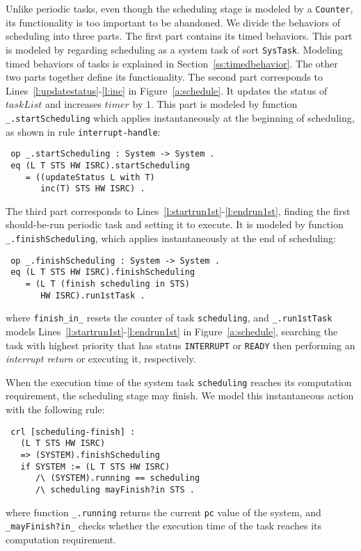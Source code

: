 \documentclass[10pt,journal]{IEEEtran}
\newcommand{\hide}[1]{\ignorespaces}
\begin{document}
Unlike periodic tasks, even though the scheduling stage is modeled by
a \verb|Counter|, its functionality is too important to be abandoned.
We divide the behaviors of scheduling into three parts.  The first
part contains its timed behaviors. This part is modeled by regarding
scheduling as a system task of sort \verb|SysTask|. Modeling timed
behaviors of tasks is explained in Section~\ref{ss:timedbehavior}.
The other two parts together define its functionality. The second part
corresponds to Lines~\ref{l:updatestatus}-\ref{l:inc} in
Figure~\ref{a:schedule}. It updates the status of $taskList$ and
increases $timer$ by $1$. This part is modeled by function
\verb|_.startScheduling| which applies instantaneously at the
beginning of scheduling, as shown in rule \verb|interrupt-handle|:
\begin{verbatim}
 op _.startScheduling : System -> System .
 eq (L T STS HW ISRC).startScheduling 
    = ((updateStatus L with T) 
       inc(T) STS HW ISRC) .
\end{verbatim}
The third part corresponds to
Lines~\ref{l:startrun1st}-\ref{l:endrun1st}, finding the first
should-be-run periodic task and setting it to execute. It is modeled
by function \verb|_.finishScheduling|, which applies instantaneously
at the end of scheduling:
\begin{verbatim}
 op _.finishScheduling : System -> System .
 eq (L T STS HW ISRC).finishScheduling
    = (L T (finish scheduling in STS) 
       HW ISRC).run1stTask .
\end{verbatim}
where \verb|finish_in_| resets the counter of task \verb|scheduling|,
and \verb|_.run1stTask| models
Lines~\ref{l:startrun1st}-\ref{l:endrun1st} in
Figure~\ref{a:schedule}, searching the task with highest priority
that has status \verb|INTERRUPT| or \verb|READY| then performing an
\emph{interrupt return} or executing it, respectively.

When the execution time of the system task \verb|scheduling| reaches
its computation requirement, the scheduling stage may finish. We model
this instantaneous action with the following rule:
\begin{verbatim}
 crl [scheduling-finish] :
   (L T STS HW ISRC) 
   => (SYSTEM).finishScheduling
   if SYSTEM := (L T STS HW ISRC) 
      /\ (SYSTEM).running == scheduling 
      /\ scheduling mayFinish?in STS .
\end{verbatim}
where function \verb|_.running| returns the current \verb|pc| value of
the system, and \verb|_mayFinish?in_| checks whether the execution
time of the task reaches its computation requirement.
\hide{
\begin{verbatim}
  op _mayFinish?in_ : Oid SysTasks ~> Bool .
  eq O mayFinish?in [ < O : SysTask | cnt : C > REST ] 
       = C mayFinish? .
  op _mayFinish? : Counter -> Bool .
  eq [ R / [ MIN , MAX ] ] mayFinish?
       = if R lt MIN then false else true fi .
\end{verbatim}}
\end{document}
